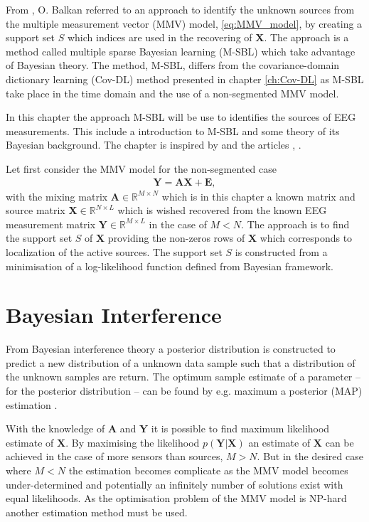 From \cite{phd2015}, O. Balkan referred to an approach to identify the unknown sources from the multiple measurement vector (MMV) model, \ref{eq:MMV_model}, by creating a support set $S$ which indices are used in the recovering of $\mathbf{X}$. 
The approach is a method called multiple sparse Bayesian learning (M-SBL) which take advantage of Bayesian theory.
The method, M-SBL, differs from the covariance-domain dictionary learning (Cov-DL) method presented in chapter \ref{ch:Cov-DL} as M-SBL take place in the time domain and the use of a non-segmented MMV model. 

In this chapter the approach M-SBL will be use to identifies the sources of EEG measurements. This include a introduction to M-SBL and some theory of its Bayesian background. The chapter is inspired by \cite{phd_wipf} and the articles \cite{article_wipf}, \cite{Balkan2014}.

Let first consider the MMV model for the non-segmented case
\begin{align*}
\mathbf{Y} = \mathbf{AX} + \mathbf{E},
\end{align*}
with the mixing matrix $\mathbf{A} \in \mathbb{R}^{M \times N}$ which is in this chapter a known matrix and source matrix $\mathbf{X} \in \mathbb{R}^{N \times L}$ which is wished recovered from the known EEG measurement matrix $\mathbf{Y} \in \mathbb{R}^{M \times L}$ in the case of $M < N$. 
The approach is to find the support set $S$ of $\textbf{X}$ providing the non-zeros rows of $\mathbf{X}$ which corresponds to localization of the active sources. The support set $S$ is constructed from a minimisation of a log-likelihood function defined from Bayesian framework.

\section{Bayesian Interference}
From Bayesian interference theory a posterior distribution is constructed to predict a new distribution of a unknown data sample such that a distribution of the unknown samples are return. The optimum sample estimate of a parameter -- for the posterior distribution -- can be found by e.g. maximum a posterior (MAP) estimation .

With the knowledge of $\mathbf{A}$ and $\mathbf{Y}$ it is possible to find maximum likelihood estimate of $\textbf{X}$. 
By maximising the likelihood $p(\mathbf{Y} \vert \mathbf{X})$ an estimate of $\mathbf{X}$ can be achieved in the case of more sensors than sources, $M > N$. 
But in the desired case where $M < N$ the estimation becomes complicate as the MMV model becomes under-determined and potentially an infinitely number of solutions exist with equal likelihoods.
As the optimisation problem of the MMV model is NP-hard another estimation method must be used.

